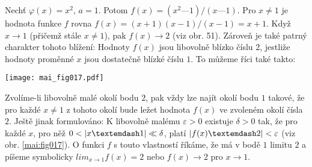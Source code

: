 \wikitextrule
\begin{example}\label{MAI:exam028}
  Nechť \(\varphi(x) = x^2\), \(a = 1\). Potom \(f(x) = (x^2 — 1 )/(x — 1)\). Pro \(x \neq 1\) je 
  hodnota funkce \(f\) rovna \(f(x) = (x + 1) (x - 1 )/(x - 1) = x + 1\). Když \(x \rightarrow 1\) 
  (přičemž stále \(x \neq 1\)), pak \(f(x) \rightarrow 2\) (viz obr. 51). Zároveň je také patrný 
  charakter tohoto blížení: Hodnoty \(f(x)\) jsou libovolně blízko číslu \(2\), jestliže hodnoty 
  proměnné \(x\) jsou dostatečně blízké číslu \(1\). To můžeme říci také takto: 
  
  {\centering
   \captionsetup{type=figure}
%   
    \texttt{[image: mai\_fig017.pdf]}
  \par}
  
  Zvolíme-li libovolně malé okolí bodu \(2\), pak vždy lze najít okolí bodu \(1\) takové, že pro 
  každé \(x \neq 1\) z tohoto okolí bude ležet hodnota \(f(x)\) ve zvoleném okolí čísla \(2\). 
  Ještě jinak formulováno: K libovolně malému \(\varepsilon > 0\) existuje \(\delta > 0\) tak, 
  že pro každé \(x\), pro něž \(0 < \abs{x — 1} \ll \delta\), platí \(\abs{f(x) — 2} < 
  \varepsilon\) (viz obr. \ref{mai:fig017}). O funkci \(f\) s touto vlastností říkáme, že má v bodě 
  \(1\) limitu \(2\) a píšeme symbolicky \(lim_{x \to 1}f(x) = 2\) nebo \(f(x) \rightarrow 2\) pro 
  \(x \rightarrow 1\).
\end{example}















